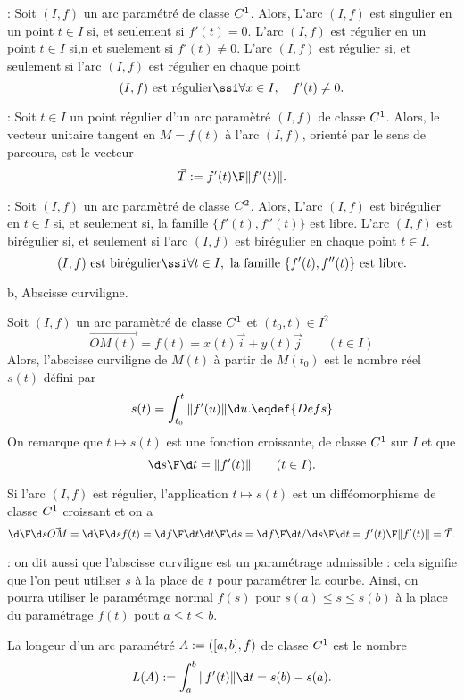 \Rappel :  Soit $(I,f)$ un arc param\'etr\'e de classe $\sc C^1$. Alors, \medskip\noindent
L'arc $(I,f)$ est singulier en un point $t\in I$ si, et seulement si $f'(t)=0$. \medskip\noindent
L'arc $(I,f)$ est r\'egulier en un point $t\in I$ si,n et suelement si $f'(t)\neq 0$. \medskip\noindent
L'arc $(I,f)$ est r\'egulier si, et seulement si 
l'arc $(I,f)$ est r\'egulier en chaque point 
$$
(I,f)\mbox{ est r\'egulier}\ssi\forall x\in I, \quad f'(t)\neq 0.
$$

\Rappel :  Soit $t\in I$ un point r\'egulier d'un arc param\`etr\'e $(I,f)$ de classe $\sc C^1$. 
Alors, le vecteur unitaire tangent en $M=f(t)$ \`a l'arc $(I,f)$, orient\'e par le sens de parcours, est le vecteur 
$$
\vec T:={f'(t)\F\|f'(t)\|}. 
$$


\Rappel :  Soit $(I,f)$ un arc param\`etr\'e de classe $\sc C^2$. Alors, \medskip\noindent
L'arc $(I,f)$ est bir\'egulier en $t\in I$ si, et seulement si, la famille $\{f'(t), f''(t)\}$ est libre. \medskip\noindent
L'arc $(I,f)$ est bir\'egulier si, et seulement si l'arc $(I,f)$ est bir\'egulier en chaque point $t\in I$. 
$$
(I,f)\mbox{ est bir\'egulier}\ssi\forall t\in I,\mbox{ la famille }\{f'(t),f''(t)\} \mbox{ est libre}.
$$



\Section b, Abscisse curviligne. 


\Definition []  Soit $(I,f)$ un arc param\`etr\'e de classe $\sc C^1$ et $(t_0,t)\in I^2$
$$
\vec{OM(t)}=f(t)=x(t)\vec i+y(t)\vec j\qquad (t\in I)
$$
Alors, l'abscisse curviligne de $M(t)$ \`a partir de $M(t_0)$ est le nombre r\'eel $s(t)$ d\'efini par 
$$
s(t)=\int_{t_0}^t\|f'(u)\|\d u. \eqdef{Defs}
$$
On remarque que $t\mapsto s(t)$ est une fonction croissante, de classe $\sc C^1$ sur $I$ et que 
$$
{\d s\F\d t}=\|f'(t)\|\qquad(t\in I).
$$


\Propriete []  Si l'arc $(I,f)$ est r\'egulier, l'application $t\mapsto s(t)$ est un diff\'eomorphisme 
de classe $\sc C^1$ croissant et on a 
$$
{\d\F\d s}\vec{OM}={\d \F\d s}f(t)={\d f\F \d t}{\d t\F\d s}={\d f\F \d t}/{\d s\F\d t}={f'(t)\F\|f'(t)\|}=\vec T.
$$

\Remarque : on dit aussi que l'abscisse curviligne est un param\'etrage admissible : cela signifie que l'on peut utiliser $s$ \`a la place de $t$ 
pour param\'etrer la courbe. Ainsi, on pourra utiliser le param\'etrage normal $f(s)$ pour $s(a)\le s\le s(b)$ \`a la place du param\'etrage $f(t)$ pout $a\le t\le b$. 
\bigskip

\Definition []  La longeur d'un arc param\'etr\'e $\sc A:=([a,b],f)$ de classe $\sc C^1$ est le nombre 
$$
L(\sc A):=\int_a^b\|f'(t)\|\d t=s(b)-s(a). 
$$

